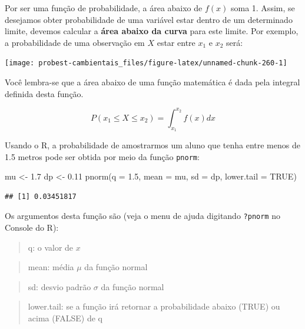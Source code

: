 \documentclass[
]{book}
\newenvironment{Shaded}{\begin{snugshade}}{\end{snugshade}}
\newcommand{\AttributeTok}[1]{\textcolor[rgb]{0.77,0.63,0.00}{#1}}
\newcommand{\ConstantTok}[1]{\textcolor[rgb]{0.00,0.00,0.00}{#1}}
\newcommand{\FloatTok}[1]{\textcolor[rgb]{0.00,0.00,0.81}{#1}}
\newcommand{\FunctionTok}[1]{\textcolor[rgb]{0.00,0.00,0.00}{#1}}
\newcommand{\NormalTok}[1]{#1}
\newcommand{\OtherTok}[1]{\textcolor[rgb]{0.56,0.35,0.01}{#1}}
\begin{document}
Por ser uma função de probabilidade, a área abaixo de \(f(x)\) soma 1. Assim, se desejamos obter probabilidade de uma variável estar dentro de um determinado limite, devemos calcular a \textbf{área abaixo da curva} para este limite. Por exemplo, a probabilidade de uma observação em \(X\) estar entre \(x_1\) e \(x_2\) será:

\begin{center}\texttt{[image: probest-cambientais\_files/figure-latex/unnamed-chunk-260-1]} \end{center}

Você lembra-se que a área abaixo de uma função matemática é dada pela integral definida desta função.

\[P(x_1 \le X \le x_2) = \int_{x_1}^{x_2}f(x) dx\]

Usando o R, a probabilidade de amostrarmos um aluno que tenha entre menos de 1.5 metros pode ser obtida por meio da função \texttt{pnorm}:

\begin{Shaded}
\begin{Highlighting}[]
\NormalTok{mu }\OtherTok{\textless{}{-}} \FloatTok{1.7}
\NormalTok{dp }\OtherTok{\textless{}{-}} \FloatTok{0.11}
\FunctionTok{pnorm}\NormalTok{(}\AttributeTok{q =} \FloatTok{1.5}\NormalTok{, }\AttributeTok{mean =}\NormalTok{ mu, }\AttributeTok{sd =}\NormalTok{ dp, }\AttributeTok{lower.tail =} \ConstantTok{TRUE}\NormalTok{)}
\end{Highlighting}
\end{Shaded}

\begin{verbatim}
## [1] 0.03451817
\end{verbatim}

Os argumentos desta função são (veja o menu de ajuda digitando \texttt{?pnorm} no Console do R):

\begin{quote}
q: o valor de \(x\)
\end{quote}

\begin{quote}
mean: média \(\mu\) da função normal
\end{quote}

\begin{quote}
sd: desvio padrão \(\sigma\) da função normal
\end{quote}

\begin{quote}
lower.tail: se a função irá retornar a probabilidade abaixo (TRUE) ou acima (FALSE) de q
\end{quote}
\end{document}
